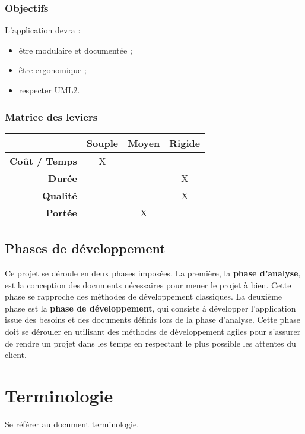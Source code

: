 \documentclass[hidelinks, 10pt,a4paper]{article}
\begin{document}
\subsubsection*{Objectifs}
L'application devra :
\begin{itemize}
\item être modulaire et documentée ;
\item être ergonomique ;
\item respecter UML2.
\end{itemize}

\subsubsection{Matrice des leviers}

\begin{center}
\begin{tabular}{|r|c|c|c|}
   \hline{} & {\textbf{Souple}} & {\textbf{Moyen}} & {\textbf{Rigide}} \\\hline
   {\textbf{Coût / Temps}} & {X} & {} & {} \\\hline
   {\textbf{Durée}} & {} & {} & {X} \\\hline
   {\textbf{Qualité}} & {} & {} & {X} \\\hline
   {\textbf{Portée}} & {} & {X} & {} \\\hline
\end{tabular}
\end{center}

\subsection{Phases de développement}
Ce projet se déroule en deux phases imposées. La première,
la \textbf{phase d'analyse}, est la conception des documents nécessaires pour
mener le projet à bien. Cette phase se rapproche des méthodes de développement
classiques. La deuxième phase est la \textbf{phase de développement}, qui consiste
à développer l'application issue des besoins et des documents définis lors de la
phase d'analyse. Cette phase doit se dérouler en utilisant des méthodes de développement
agiles pour s'assurer de rendre un projet dans les temps en respectant le plus possible 
les attentes du client.

\newpage
\section{Terminologie}
  Se référer au document terminologie.
\end{document}
